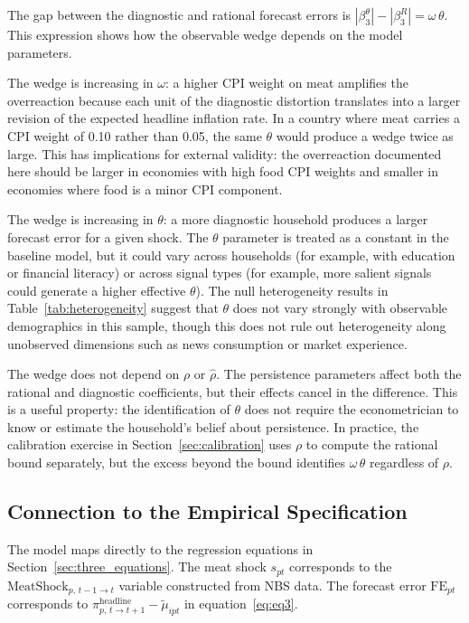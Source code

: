 The gap between the diagnostic and rational forecast errors is
$|\beta_3^\theta| - |\beta_3^R| = \omega\,\theta$.
This expression shows how the observable wedge depends on the
model parameters.

The wedge is increasing in $\omega$: a higher CPI weight on
meat amplifies the overreaction because each unit of the
diagnostic distortion translates into a larger revision of
the expected headline inflation rate.
In a country where meat carries a CPI weight of 0.10 rather
than 0.05, the same $\theta$ would produce a wedge twice as
large.
This has implications for external validity: the overreaction
documented here should be larger in economies with high food
CPI weights and smaller in economies where food is a minor
CPI component.

The wedge is increasing in $\theta$: a more diagnostic
household produces a larger forecast error for a given shock.
The $\theta$ parameter is treated as a constant in the
baseline model, but it could vary across households (for
example, with education or financial literacy) or across
signal types (for example, more salient signals could
generate a higher effective $\theta$).
The null heterogeneity results in Table~\ref{tab:heterogeneity}
suggest that $\theta$ does not vary strongly with observable
demographics in this sample, though this does not rule out
heterogeneity along unobserved dimensions such as news
consumption or market experience.

The wedge does not depend on $\rho$ or $\hat{\rho}$.
The persistence parameters affect both the rational and
diagnostic coefficients, but their effects cancel in the
difference.
This is a useful property: the identification of $\theta$
does not require the econometrician to know or estimate the
household's belief about persistence.
In practice, the calibration exercise in
Section~\ref{sec:calibration} uses $\rho$ to compute the
rational bound separately, but the excess beyond the bound
identifies $\omega\,\theta$ regardless of $\rho$.

\subsection{Connection to the Empirical Specification}

The model maps directly to the regression equations in
Section~\ref{sec:three_equations}.
The meat shock $s_{pt}$ corresponds to the
$\mathrm{MeatShock}_{p,\,t-1\to t}$ variable constructed from
NBS data.
The forecast error $\mathrm{FE}_{pt}$ corresponds to
$\pi^{\text{headline}}_{p,\,t\to t+1} - \tilde{\mu}_{ipt}$
in equation~\eqref{eq:eq3}.

